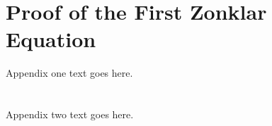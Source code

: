 \appendices
\section{Proof of the First Zonklar Equation}
Appendix one text goes here.

\section{}
Appendix two text goes here.